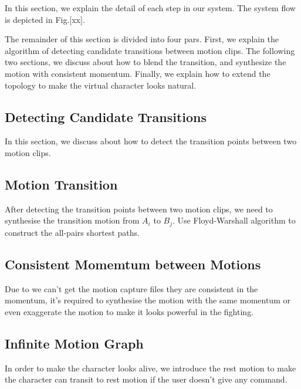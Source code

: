 In this section, we explain the detail of each step in our system. The system 
flow is depicted in Fig.[xx]. 

The remainder of this section is divided into four pars. 
First, we explain the algorithm of detecting candidate transitions between 
motion clips. The following two sections, we discuss about how to blend the 
transition, and synthesize the motion with consistent momentum.
Finally, we explain how to extend the topology to make the virtual character 
looks natural.


\subsection{Detecting Candidate Transitions}
In this section, we discuss about how to detect the transition points between two 
motion clips. 



\subsection{Motion Transition}
After detecting the transition points between two motion clips, we need to 
synthesise the transition motion from $A_i$ to $B_j$. 
Use Floyd-Warshall algorithm to construct the all-pairs shortest paths. 



\subsection{Consistent Momemtum between Motions}
Due to we can't get the motion capture files they are consistent in the 
momentum, it's required to synthesise the motion with the same momentum or even 
exaggerate the motion to make it looks powerful in the fighting.


\subsection{Infinite Motion Graph}
In order to make the character looks alive, we introduce the rest motion to make 
the character can transit to rest motion if the user doesn't give any command.

